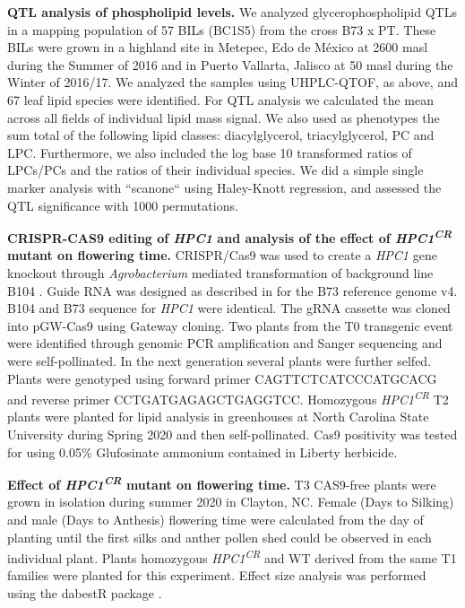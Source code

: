 \documentclass[9pt,twocolumn,twoside,lineno]{BioRxiv}
\begin{document}
\textbf{QTL analysis of phospholipid levels.}
We analyzed glycerophospholipid QTLs in a mapping population of 57 BILs (BC1S5) from the cross B73 x PT.
These BILs were grown in a highland site in Metepec, Edo de México at 2600 masl during the Summer of 2016 and in Puerto Vallarta, Jalisco at 50 masl during the Winter of 2016/17.  
We analyzed the samples using UHPLC-QTOF, as above, and 67 leaf lipid species were identified.
For QTL analysis we calculated the mean across all fields of individual lipid mass signal. 
We also used as phenotypes the sum total of the following lipid classes: diacylglycerol, triacylglycerol, PC and  LPC.  
Furthermore,  we also included the log base 10 transformed ratios of LPCs/PCs and the ratios of their individual species. 
We did a simple single marker analysis  with ``scanone`` using Haley-Knott  regression, and assessed the QTL significance with 1000 permutations.

\textbf{CRISPR-CAS9 editing of \textit{HPC1} and analysis of the effect of \textit{HPC1\textsuperscript{CR}} mutant on flowering time.}
CRISPR/Cas9 was used to create a \textit{HPC1} gene knockout through \textit{Agrobacterium} mediated transformation of background line B104 \cite{Wu2020-nq, Char2017-uk}. 
Guide RNA was designed as described in \cite{Brazelton2015-co} for the B73 reference genome v4. 
B104 and B73 sequence for \textit{HPC1} were identical. 
The gRNA cassette was cloned into pGW-Cas9 using Gateway cloning. 
Two plants from the T0 transgenic event were identified through genomic PCR amplification and Sanger sequencing and were self-pollinated. 
In the next generation several plants were further selfed.
Plants were genotyped using forward primer CAGTTCTCATCCCATGCACG and reverse primer CCTGATGAGAGCTGAGGTCC.
Homozygous \textit{HPC1\textsuperscript{CR}} T2 plants were  planted for lipid analysis in greenhouses at  North Carolina State University during Spring 2020 and then self-pollinated. 
Cas9 positivity was tested for using 0.05\% Glufosinate ammonium contained in Liberty herbicide. 


\textbf{Effect of \textit{HPC1\textsuperscript{CR}} mutant on flowering time.}
T3 CAS9-free plants were grown in isolation during summer 2020 in Clayton, NC. 
Female (Days to Silking) and male (Days to Anthesis) flowering time were calculated from the day of planting until the first silks and anther pollen shed could be observed in each individual plant. 
Plants homozygous \textit{HPC1\textsuperscript{CR}} and WT derived from the same T1 families were planted for this experiment. 
Effect size analysis was performed using the dabestR package \cite{Ho2019-yl}.
\end{document}
